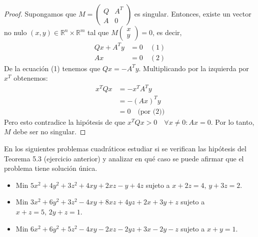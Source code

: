 \documentclass{article}
\newcommand{\R}{\mathbb{R}}
\newenvironment{theorem}[2][Ejercicio]{\begin{trivlist}
\item[\hskip \labelsep {\bfseries #1}\hskip \labelsep {\bfseries #2.}]}{\end{trivlist}}
\begin{document}
\begin{proof}
    Supongamos que \( M = \begin{pmatrix}
        Q & A^T \\
        A & 0
    \end{pmatrix} \) es singular. Entonces, existe un vector no nulo \( (x,y) \in \R^{n} \times \R^{m} \) tal que \( M \begin{pmatrix}
        x \\
        y
    \end{pmatrix} = 0 \), es decir, \begin{align*}
        Qx + A^T y & = 0 \quad (1) \\
        Ax         & = 0 \quad (2)
    \end{align*}
    De la ecuación (1) tenemos que \( Qx = -A^T y \). Multiplicando por la izquierda por \( x^T \) obtenemos: \begin{align*}
        x^T Q x & = -x^T A^T y                         \\
                & = {-(Ax)}^T y                        \\
                & = 0           \quad \text{(por (2))}
    \end{align*}
    Pero esto contradice la hipótesis de que \( x^T Q x > 0 \quad \forall x \neq 0 : Ax = 0 \). Por lo tanto, \( M \) debe ser no singular.
\end{proof}

\begin{theorem}{3}
    En los siguientes problemas cuadráticos estudiar si se verifican las hipótesis del Teorema 5.3 (ejercicio anterior) y analizar en qué caso se puede afirmar que el problema tiene solución única.
    \begin{itemize}
        \item[(a)] Min \( 5x^2 + 4y^2 + 3z^2 + 4xy + 2xz - y + 4z \) sujeto a \( x + 2z = 4, \, y + 3z = 2 \).
        \item[(b)] Min \( 3x^2 + 6y^2 + 3z^2 - 4xy + 8xz + 4yz + 2x + 3y + z \) sujeto a \( x + z = 5, \, 2y + z = 1 \).
        \item[(c)] Min \( 6x^2 + 6y^2 + 5z^2 - 4xy - 2xz - 2yz + 3x - 2y - z \) sujeto a \( x + y = 1 \).
    \end{itemize}
\end{theorem}
\end{document}

